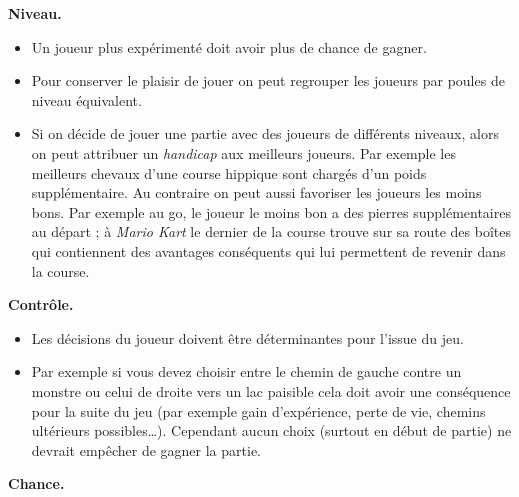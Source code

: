 \documentclass[11pt,class=report,crop=false]{standalone}
\begin{document}
\medskip

\textbf{Niveau.}

\begin{itemize}
	\item Un joueur plus expérimenté doit avoir plus de chance de gagner.
	
	\item Pour conserver le plaisir de jouer on peut regrouper les joueurs par poules de niveau équivalent.

	\item Si on décide de jouer une partie avec des joueurs de différents niveaux, alors on peut attribuer un \emph{handicap} aux meilleurs joueurs. Par exemple les meilleurs chevaux d'une course hippique sont chargés d'un poids supplémentaire.
 	Au contraire on peut aussi favoriser les joueurs les moins bons. Par exemple au go, le joueur le moins bon a des pierres supplémentaires au départ ; à \emph{Mario Kart} le dernier de la course trouve sur sa route des boîtes qui contiennent des avantages conséquents qui lui permettent de revenir dans la course.
 	
\end{itemize}
\medskip

\textbf{Contrôle.}

\begin{itemize}
	\item Les décisions du joueur doivent être déterminantes pour l'issue du jeu.
	
	\item Par exemple si vous devez choisir entre le chemin de gauche contre un monstre ou celui de droite vers un lac paisible cela doit avoir une conséquence pour la suite du jeu (par exemple gain d'expérience, perte de vie, chemins ultérieurs possibles\ldots). Cependant aucun choix (surtout en début de partie) ne devrait empêcher de gagner la partie.

\end{itemize}

\medskip

\textbf{Chance.}
\end{document}
